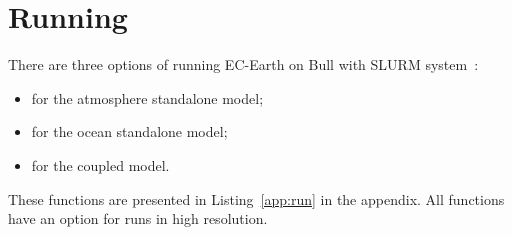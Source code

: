 \section{Running}
There are three options of running EC-Earth on Bull with SLURM system~\cite{slurm}:
\begin{itemize}
  \item {} for the atmosphere standalone model;    
  \item {} for the ocean standalone model;    
  \item {} for the coupled model.
\end{itemize}
These functions are presented in Listing~\ref{app:run} in the appendix. All functions have an option  for runs in high resolution. 
